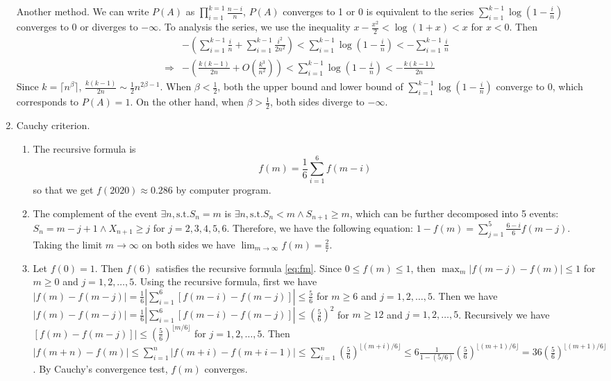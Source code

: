 \documentclass{article}
\begin{document}
\begin{enumerate}
Another method. We can write $P(A)$ as $\prod_{i=1}^{k=1}\frac{n-i}{n}$, $P(A)$
converges to 1 or 0 is equivalent to the series $\sum_{i=1}^{k-1} \log(1-\frac{i}{n})$ converges to 0 or diverges to $-\infty$. To analysis the
series, we use the inequality $x-\frac{x^2}{2} < \log (1+x) < x$ for $x<0$.
Then 
\begin{align*}
&-\left(\sum_{i=1}^{k-1} \frac{i}{n}+\sum_{i=1}^{k-1} \frac{i^2}{2n^2}\right) < \sum_{i=1}^{k-1} \log(1-\frac{i}{n}) < -\sum_{i=1}^{k-1} \frac{i}{n}\\
\Rightarrow & -\left(
\frac{k(k-1)}{2n}+O(\frac{k^3}{n^2})
\right) < \sum_{i=1}^{k-1} \log(1-\frac{i}{n}) < -\frac{k(k-1)}{2n}
\end{align*}
Since $k=\lceil n^{\beta} \rceil$,  $\frac{k(k-1)}{2n} \sim \frac{1}{2}n^{2\beta -1}$. When $\beta < \frac{1}{2}$, both 
the upper bound and lower bound of $\sum_{i=1}^{k-1} \log(1-\frac{i}{n}) $
converge to 0, which corresponds to $P(A)=1$. On the other hand, when $\beta > \frac{1}{2}$,
both sides diverge to $-\infty$.
        \item Cauchy criterion.
\begin{enumerate}
    \item The recursive formula is
    \begin{equation}\label{eq:fm}
    f(m) = \frac{1}{6}\sum_{i=1}^6 f(m-i)
    \end{equation}
    so that we get
    $f(2020)\approx 0.286$ by computer program.
    \item The complement of the event $\exists n, \textrm{s.t.} S_n=m$
    is $\exists n,\textrm{s.t.} S_n<m \wedge S_{n+1} \geq m$, which can
    be further decomposed into 5 events: $S_n = m-j+1 \wedge X_{n+1} \geq j$ for $j=2,3,4,5,6$. Therefore, we have the following equation:
    $1-f(m)=\sum_{j=1}^5 \frac{6-i}{6}f(m-j)$. Taking the limit $m\to \infty$
    on both sides we have $\lim_{m\to\infty}f(m)=\frac{2}{7}$.
    \item
    Let $f(0)=1$. Then $f(6)$ satisfies the recursive formula
    \eqref{eq:fm}.
        Since $0 \leq f(m)\leq 1$, then $\max_{m} |f(m-j)-f(m)| \leq 1$
        for $m\geq 0$ and $j=1,2,\dots, 5$. Using the recursive
        formula,
    first we have
    $|f(m)-f(m-j)|=\frac{1}{6}|\sum_{i=1}^6 [f(m-i)-f(m-j)]| \leq \frac{5}{6}$ for $m\geq 6$ and $j=1,2,\dots, 5$.
    Then we have $|f(m)-f(m-j)|=\frac{1}{6}|\sum_{i=1}^6 [f(m-i)-f(m-j)]| \leq (\frac{5}{6})^2$ for $m\geq 12$ and $j=1,2,\dots, 5$.
    Recursively we have
    $[f(m)-f(m-j)]| \leq (\frac{5}{6})^{\lfloor m/6 \rfloor} $ for $j=1,2,\dots, 5$.
    Then
    $|f(m+n)-f(m)|\leq 
    \sum_{i=1}^n |f(m+i)-f(m+i-1)| \leq \sum_{i=1}^n (\frac{5}{6})^{\lfloor (m+i)/6 \rfloor} \leq
    6 \frac{1}{1-(5/6)} (\frac{5}{6})^{\lfloor (m+1)/6 \rfloor}=36 (\frac{5}{6})^{\lfloor (m+1)/6 \rfloor}$.
    By Cauchy's convergence test, $f(m)$ converges.
    

\end{enumerate}
\end{enumerate}
\end{document}
